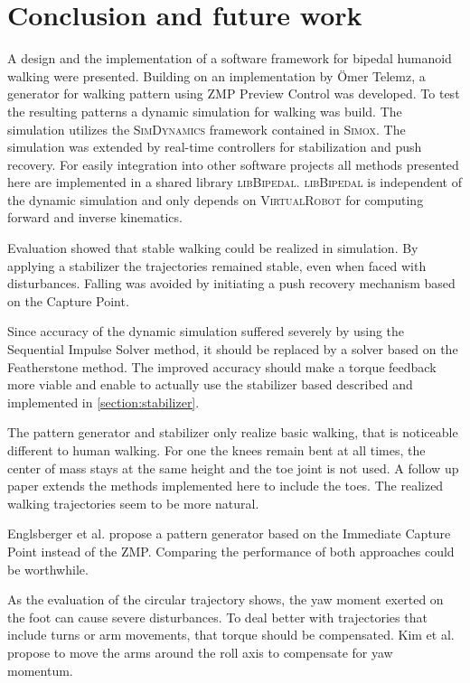 \documentclass[english,ngerman]{KITreprt}
\newcommand{\name}[1]{\textsc{#1}}
\begin{document}
\chapter{Conclusion and future work}\label{conclusion-and-future-work}

A design and the implementation of a software framework for bipedal
humanoid walking were presented. Building on an implementation by Ömer
Telemz, a generator for walking pattern using ZMP Preview Control was
developed. To test the resulting patterns a dynamic simulation for
walking was build. The simulation utilizes the \name{SimDynamics}
framework contained in \name{Simox}. The simulation was extended by
real-time controllers for stabilization and push recovery. For easily
integration into other software projects all methods presented here are
implemented in a shared library \name{libBipedal}. \name{libBipedal} is
independent of the dynamic simulation and only depends on
\name{VirtualRobot} for computing forward and inverse kinematics.

Evaluation showed that stable walking could be realized in simulation.
By applying a stabilizer the trajectories remained stable, even when
faced with disturbances. Falling was avoided by initiating a push
recovery mechanism based on the Capture Point.

Since accuracy of the dynamic simulation suffered severely by using the
Sequential Impulse Solver method, it should be replaced by a solver
based on the Featherstone method. The improved accuracy should make a
torque feedback more viable and enable to actually use the stabilizer
based described and implemented in \ref{section:stabilizer}.

The pattern generator and stabilizer only realize basic walking, that is
noticeable different to human walking. For one the knees remain bent at
all times, the center of mass stays at the same height and the toe joint
is not used. A follow up paper \cite{kajita2012evaluation} extends the
methods implemented here to include the toes. The realized walking
trajectories seem to be more natural.

Englsberger et al. \cite{englsberger2011bipedal} propose a pattern
generator based on the Immediate Capture Point instead of the ZMP.
Comparing the performance of both approaches could be worthwhile.

As the evaluation of the circular trajectory shows, the yaw moment
exerted on the foot can cause severe disturbances. To deal better with
trajectories that include turns or arm movements, that torque should be
compensated. Kim et al.\cite{kim2005humanoid} propose to move the arms
around the roll axis to compensate for yaw momentum.
\end{document}
